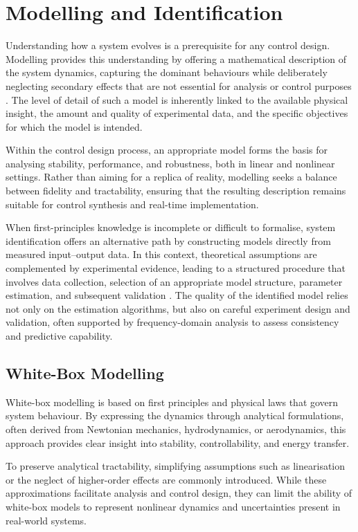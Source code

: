\section{Modelling and Identification}

Understanding how a system evolves is a prerequisite for any control design. Modelling provides this understanding by offering a mathematical description of the system dynamics, capturing the dominant behaviours while deliberately neglecting secondary effects that are not essential for analysis or control purposes \cite{modeling_Silva}. The level of detail of such a model is inherently linked to the available physical insight, the amount and quality of experimental data, and the specific objectives for which the model is intended.

Within the control design process, an appropriate model forms the basis for analysing stability, performance, and robustness, both in linear and nonlinear settings. Rather than aiming for a replica of reality, modelling seeks a balance between fidelity and tractability, ensuring that the resulting description remains suitable for control synthesis and real-time implementation.

When first-principles knowledge is incomplete or difficult to formalise, system identification offers an alternative path by constructing models directly from measured input--output data. In this context, theoretical assumptions are complemented by experimental evidence, leading to a structured procedure that involves data collection, selection of an appropriate model structure, parameter estimation, and subsequent validation \cite{tangirala2013principles}. The quality of the identified model relies not only on the estimation algorithms, but also on careful experiment design and validation, often supported by frequency-domain analysis to assess consistency and predictive capability.

\subsection{White-Box Modelling}

White-box modelling is based on first principles and physical laws that govern system behaviour. By expressing the dynamics through analytical formulations, often derived from Newtonian mechanics, hydrodynamics, or aerodynamics, this approach provides clear insight into stability, controllability, and energy transfer.

To preserve analytical tractability, simplifying assumptions such as linearisation or the neglect of higher-order effects are commonly introduced. While these approximations facilitate analysis and control design, they can limit the ability of white-box models to represent nonlinear dynamics and uncertainties present in real-world systems.


